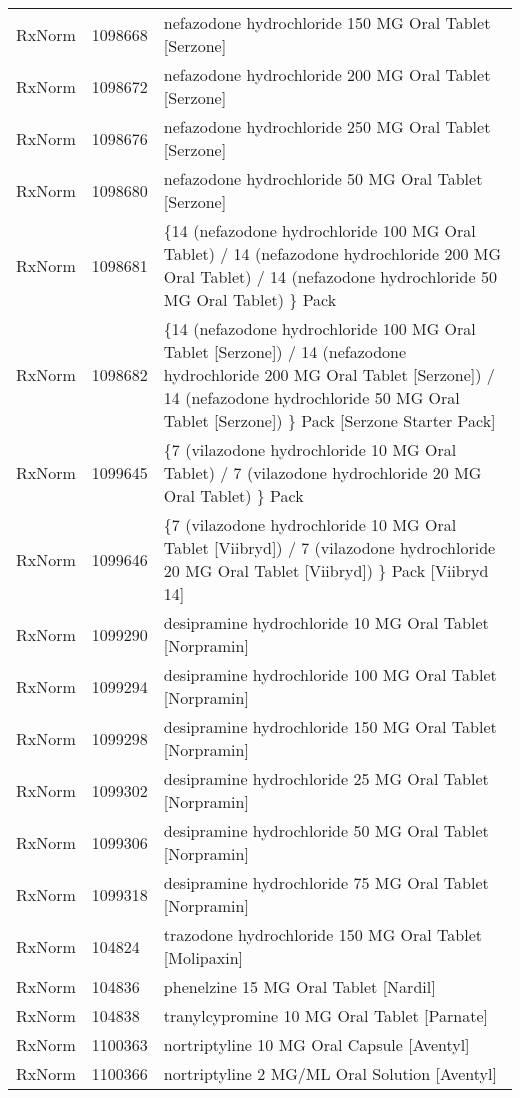 \begin{longtable}{p{}p{}p{}}
  RxNorm & 1098668 & nefazodone hydrochloride 150 MG Oral Tablet [Serzone] \\ 
  RxNorm & 1098672 & nefazodone hydrochloride 200 MG Oral Tablet [Serzone] \\ 
  RxNorm & 1098676 & nefazodone hydrochloride 250 MG Oral Tablet [Serzone] \\ 
  RxNorm & 1098680 & nefazodone hydrochloride 50 MG Oral Tablet [Serzone] \\ 
  RxNorm & 1098681 & \{14 (nefazodone hydrochloride 100 MG Oral Tablet) / 14 (nefazodone hydrochloride 200 MG Oral Tablet) / 14 (nefazodone hydrochloride 50 MG Oral Tablet) \} Pack \\ 
  RxNorm & 1098682 & \{14 (nefazodone hydrochloride 100 MG Oral Tablet [Serzone]) / 14 (nefazodone hydrochloride 200 MG Oral Tablet [Serzone]) / 14 (nefazodone hydrochloride 50 MG Oral Tablet [Serzone]) \} Pack [Serzone Starter Pack] \\ 
  RxNorm & 1099645 & \{7 (vilazodone hydrochloride 10 MG Oral Tablet) / 7 (vilazodone hydrochloride 20 MG Oral Tablet) \} Pack \\ 
  RxNorm & 1099646 & \{7 (vilazodone hydrochloride 10 MG Oral Tablet [Viibryd]) / 7 (vilazodone hydrochloride 20 MG Oral Tablet [Viibryd]) \} Pack [Viibryd 14] \\ 
  RxNorm & 1099290 & desipramine hydrochloride 10 MG Oral Tablet [Norpramin] \\ 
  RxNorm & 1099294 & desipramine hydrochloride 100 MG Oral Tablet [Norpramin] \\ 
  RxNorm & 1099298 & desipramine hydrochloride 150 MG Oral Tablet [Norpramin] \\ 
  RxNorm & 1099302 & desipramine hydrochloride 25 MG Oral Tablet [Norpramin] \\ 
  RxNorm & 1099306 & desipramine hydrochloride 50 MG Oral Tablet [Norpramin] \\ 
  RxNorm & 1099318 & desipramine hydrochloride 75 MG Oral Tablet [Norpramin] \\ 
  RxNorm & 104824 & trazodone hydrochloride 150 MG Oral Tablet [Molipaxin] \\ 
  RxNorm & 104836 & phenelzine 15 MG Oral Tablet [Nardil] \\ 
  RxNorm & 104838 & tranylcypromine 10 MG Oral Tablet [Parnate] \\ 
  RxNorm & 1100363 & nortriptyline 10 MG Oral Capsule [Aventyl] \\ 
  RxNorm & 1100366 & nortriptyline 2 MG/ML Oral Solution [Aventyl] \\ 

\end{longtable}
